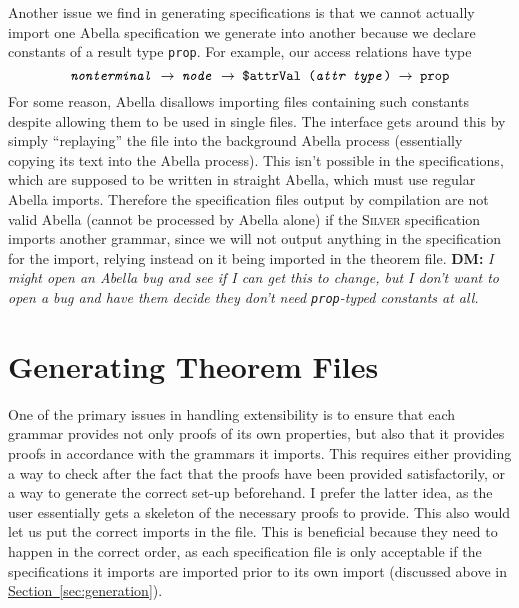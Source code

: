 \documentclass[11pt]{article}
\renewcommand{\sec}[1]{\hyperref[sec:#1]{Section~\ref*{sec:#1}}}
\newcommand{\tyarrow}{\ensuremath{\rightarrow}}
\newcommand{\silver}{\textsc{Silver}}
\newcommand{\dnote}[1]{{\color{orange} \textbf{DM:} \emph{#1}}}
\begin{document}
Another issue we find in generating specifications is that we cannot
actually import one Abella specification we generate into another
because we declare constants of a result type \texttt{prop}.  For
example, our access relations have type
\[\texttt{\textit{nonterminal} \tyarrow{} \textit{node} \tyarrow{} \$attrVal
  (\textit{attr type}) \tyarrow{} prop}\]
%
For some reason, Abella disallows importing files containing such
constants despite allowing them to be used in single files.  The
interface gets around this by simply ``replaying'' the file into the
background Abella process (essentially copying its text into the
Abella process).  This isn't possible in the specifications, which are
supposed to be written in straight Abella, which must use regular
Abella imports.  Therefore the specification files output by
compilation are not valid Abella (cannot be processed by Abella alone)
if the \silver{} specification imports another grammar, since we will
not output anything in the specification for the import, relying
instead on it being imported in the theorem file.
\dnote{I might open an Abella bug and see if I can get this to change,
  but I don't want to open a bug and have them decide they don't need
  \texttt{prop}-typed constants at all.}





\section{Generating Theorem Files}

One of the primary issues in handling extensibility is to ensure that
each grammar provides not only proofs of its own properties, but also
that it provides proofs in accordance with the grammars it imports.
This requires either providing a way to check after the fact that the
proofs have been provided satisfactorily, or a way to generate the
correct set-up beforehand.  I prefer the latter idea, as the user
essentially gets a skeleton of the necessary proofs to provide.  This
also would let us put the correct imports in the file.  This is
beneficial because they need to happen in the correct order, as each
specification file is only acceptable if the specifications it imports
are imported prior to its own import (discussed above in
\sec{generation}).
\end{document}

